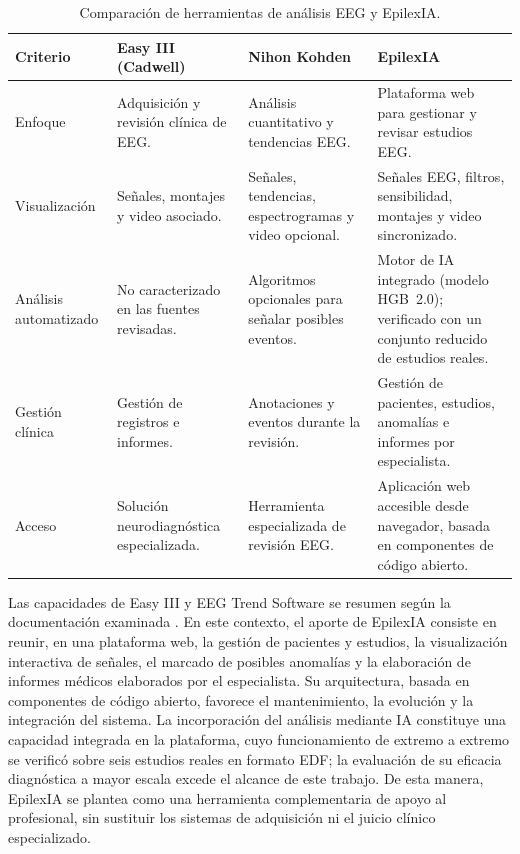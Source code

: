 \begin{table}[H]
\centering
\caption{Comparación de herramientas de análisis EEG y EpilexIA.}
\label{tab:comparacion-herramientas-eeg}
\scriptsize
\setlength{\tabcolsep}{3pt}
\renewcommand{\arraystretch}{1.10}

\begin{tabular}{|
>{\raggedright\arraybackslash}p{2.2cm}|
>{\raggedright\arraybackslash}p{2.75cm}|
>{\raggedright\arraybackslash}p{2.75cm}|
>{\raggedright\arraybackslash}p{3.25cm}|}
\hline
\textbf{Criterio} &
\textbf{Easy III (Cadwell)} &
\textbf{Nihon Kohden} &
\textbf{EpilexIA} \\
\hline

Enfoque &
Adquisición y revisión clínica de EEG. &
Análisis cuantitativo y tendencias EEG. &
Plataforma web para gestionar y revisar estudios EEG. \\
\hline

Visualización &
Señales, montajes y video asociado. &
Señales, tendencias, espectrogramas y video opcional. &
Señales EEG, filtros, sensibilidad, montajes y video sincronizado. \\
\hline

Análisis automatizado &
No caracterizado en las fuentes revisadas. &
Algoritmos opcionales para señalar posibles eventos. &
Motor de IA integrado (modelo HGB~2.0); verificado con un conjunto reducido de estudios reales. \\
\hline

Gestión clínica &
Gestión de registros e informes. &
Anotaciones y eventos durante la revisión. &
Gestión de pacientes, estudios, anomalías e informes por especialista. \\
\hline

Acceso &
Solución neurodiagnóstica especializada. &
Herramienta especializada de revisión EEG. &
Aplicación web accesible desde navegador, basada en componentes de código abierto. \\
\hline

\end{tabular}
\end{table}

Las capacidades de Easy III y EEG Trend Software se resumen
según la documentación examinada \citep{CadwellEasyIII,CadwellEasyIIISpecifications,NihonKohdenEEGTrend}.
En este contexto, el aporte de EpilexIA consiste en reunir, en una
plataforma web, la gestión de pacientes y estudios, la visualización
interactiva de señales, el marcado de posibles anomalías y la elaboración
de informes médicos elaborados por el especialista. Su arquitectura, basada en componentes de código abierto, favorece el mantenimiento, la evolución y la integración del sistema. La incorporación del análisis mediante IA constituye una capacidad integrada en la plataforma, cuyo funcionamiento de extremo a extremo se verificó sobre seis estudios reales en formato EDF; la evaluación de su eficacia diagnóstica a mayor escala excede el alcance de este trabajo.
De esta manera, EpilexIA se plantea
como una herramienta complementaria de apoyo al profesional, sin
sustituir los sistemas de adquisición ni el juicio clínico especializado.

